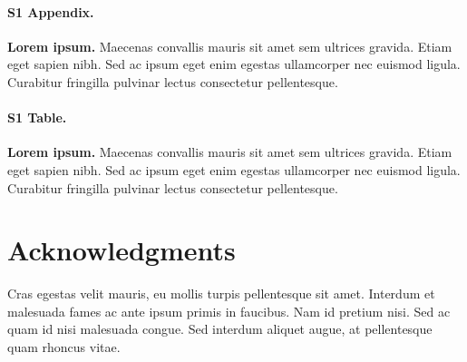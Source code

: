\documentclass[10pt,letterpaper]{article}
\begin{document}
\paragraph*{S1 Appendix.}
\label{S1_Appendix}
{\bf Lorem ipsum.} Maecenas convallis mauris sit amet sem ultrices gravida. Etiam eget sapien nibh. Sed ac ipsum eget enim egestas ullamcorper nec euismod ligula. Curabitur fringilla pulvinar lectus consectetur pellentesque.

\paragraph*{S1 Table.}
\label{S1_Table}
{\bf Lorem ipsum.} Maecenas convallis mauris sit amet sem ultrices gravida. Etiam eget sapien nibh. Sed ac ipsum eget enim egestas ullamcorper nec euismod ligula. Curabitur fringilla pulvinar lectus consectetur pellentesque.

\section*{Acknowledgments}
Cras egestas velit mauris, eu mollis turpis pellentesque sit amet. Interdum et malesuada fames ac ante ipsum primis in faucibus. Nam id pretium nisi. Sed ac quam id nisi malesuada congue. Sed interdum aliquet augue, at pellentesque quam rhoncus vitae.

\nolinenumbers

%
%
% 




\end{document}
